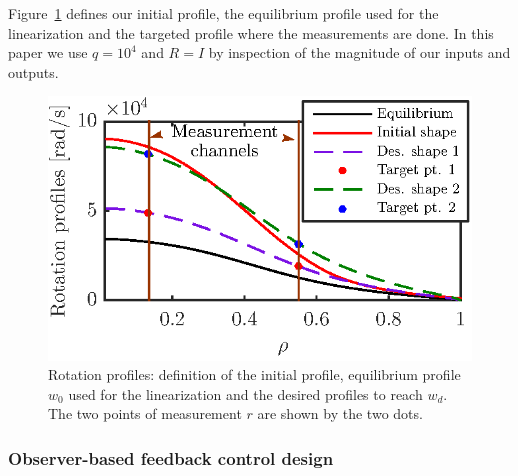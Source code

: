 \documentclass{iopart}
\begin{document}
Figure~\ref{fig:rot11} defines our initial profile, the equilibrium profile used for the linearization and the targeted profile where the measurements are done.
In this paper we use $q=10^{4}$ and $R=I$ by inspection of the magnitude of our inputs and outputs.
\begin{figure}
	\centering
\includegraphics{fig10} %
\caption{Rotation profiles: definition of the initial profile, equilibrium profile $w_0$ used for the linearization and the desired profiles to reach $w_d$. The two points of measurement $r$ are shown by the two dots.}
\label{fig:rot11}
\end{figure}




\subsubsection{Observer-based feedback control design} 
\end{document}
